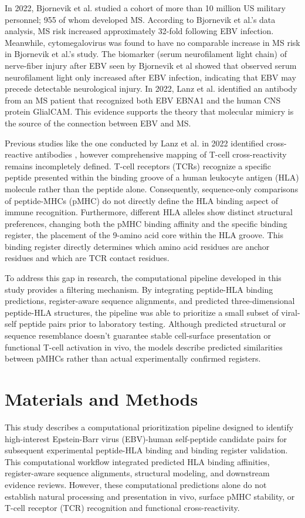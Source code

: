 \documentclass[11pt]{article}
\begin{document}
In 2022, Bjornevik et al. studied a cohort of more than 10 million US military personnel; 955 of whom developed MS. According to Bjornevik et al.’s data analysis, MS risk increased approximately 32-fold following EBV infection. Meanwhile, cytomegalovirus was found to have no comparable increase in MS risk in Bjornevik et al.’s study. The biomarker (serum neurofilament light chain) of nerve-fiber injury after EBV seen by Bjornevik et al showed that observed serum neurofilament light only increased after EBV infection, indicating that EBV may precede detectable neurological injury. \cite{bjornevik} In 2022, Lanz et al. identified an antibody from an MS patient that recognized both EBV EBNA1 and the human CNS protein GlialCAM. This evidence supports the theory that molecular mimicry is the source of the connection between EBV and MS. \cite{lanz}

Previous studies like the one conducted by Lanz et al. in 2022 identified cross-reactive antibodies \cite{lanz}, however comprehensive mapping of T-cell cross-reactivity remains incompletely defined. T-cell receptors (TCRs) recognize a specific peptide presented within the binding groove of a human leukocyte antigen (HLA) molecule rather than the peptide alone. Consequently, sequence-only comparisons of peptide-MHCs (pMHC) do not directly define the HLA binding aspect of immune recognition. Furthermore, different HLA alleles show distinct structural preferences, changing both the pMHC binding affinity and the specific binding register, the placement of the 9-amino acid core within the HLA groove. This binding register directly determines which amino acid residues are anchor residues and which are TCR contact residues.

To address this gap in research, the computational pipeline developed in this study provides a filtering mechanism. By integrating peptide-HLA binding predictions, register-aware sequence alignments, and predicted three-dimensional peptide-HLA structures, the pipeline was able to prioritize a small subset of viral-self peptide pairs prior to laboratory testing. Although predicted structural or sequence resemblance doesn’t guarantee stable cell-surface presentation or functional T-cell activation in vivo, the models describe predicted similarities between pMHCs rather than actual experimentally confirmed registers.

\FloatBarrier\section{Materials and Methods}
This study describes a computational prioritization pipeline designed to identify high-interest Epstein-Barr virus (EBV)-human self-peptide candidate pairs for subsequent experimental peptide-HLA binding and binding register validation. This computational workflow integrated predicted HLA binding affinities, register-aware sequence alignments, structural modeling, and downstream evidence reviews. However, these computational predictions alone do not establish natural processing and presentation in vivo, surface pMHC stability, or T-cell receptor (TCR) recognition and functional cross-reactivity.
\end{document}
